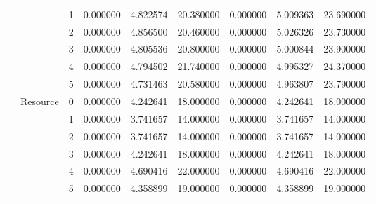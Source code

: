 \begin{tabular}{lllrrrrrr}
 &  & 1 & 0.000000 & 4.822574 & 20.380000 & 0.000000 & 5.009363 & 23.690000 \\
 &  & 2 & 0.000000 & 4.856500 & 20.460000 & 0.000000 & 5.026326 & 23.730000 \\
 &  & 3 & 0.000000 & 4.805536 & 20.800000 & 0.000000 & 5.000844 & 23.900000 \\
 &  & 4 & 0.000000 & 4.794502 & 21.740000 & 0.000000 & 4.995327 & 24.370000 \\
 &  & 5 & 0.000000 & 4.731463 & 20.580000 & 0.000000 & 4.963807 & 23.790000 \\
\cline{2-3}
 & \multirow[c]{6}{*}{Resource} & 0 & 0.000000 & 4.242641 & 18.000000 & 0.000000 & 4.242641 & 18.000000 \\
 &  & 1 & 0.000000 & 3.741657 & 14.000000 & 0.000000 & 3.741657 & 14.000000 \\
 &  & 2 & 0.000000 & 3.741657 & 14.000000 & 0.000000 & 3.741657 & 14.000000 \\
 &  & 3 & 0.000000 & 4.242641 & 18.000000 & 0.000000 & 4.242641 & 18.000000 \\
 &  & 4 & 0.000000 & 4.690416 & 22.000000 & 0.000000 & 4.690416 & 22.000000 \\
 &  & 5 & 0.000000 & 4.358899 & 19.000000 & 0.000000 & 4.358899 & 19.000000 \\
\cline{1-3} \cline{2-3}
\bottomrule
\end{tabular}
